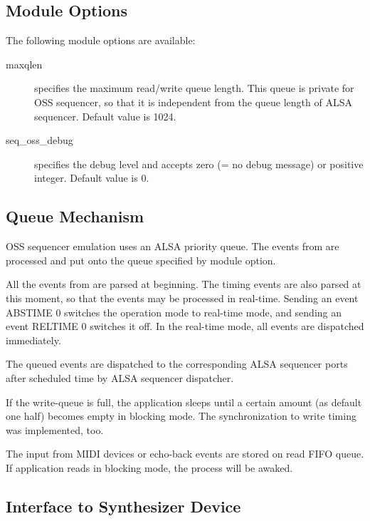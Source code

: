 \documentclass[a4paper,8pt,english]{sphinxmanual}
\begin{document}
\subsection{Module Options}
\label{sound/designs/seq-oss:module-options}
The following module options are available:
\begin{description}
\item[{maxqlen}] \leavevmode
specifies the maximum read/write queue length. This queue is private
for OSS sequencer, so that it is independent from the queue length of ALSA
sequencer. Default value is 1024.

\item[{seq\_oss\_debug}] \leavevmode
specifies the debug level and accepts zero (= no debug message) or
positive integer. Default value is 0.

\end{description}


\subsection{Queue Mechanism}
\label{sound/designs/seq-oss:queue-mechanism}
OSS sequencer emulation uses an ALSA priority queue. The
events from  are processed and put onto the queue
specified by module option.

All the events from  are parsed at beginning.
The timing events are also parsed at this moment, so that the events may
be processed in real-time. Sending an event ABSTIME 0 switches the operation
mode to real-time mode, and sending an event RELTIME 0 switches it off.
In the real-time mode, all events are dispatched immediately.

The queued events are dispatched to the corresponding ALSA sequencer
ports after scheduled time by ALSA sequencer dispatcher.

If the write-queue is full, the application sleeps until a certain amount
(as default one half) becomes empty in blocking mode. The synchronization
to write timing was implemented, too.

The input from MIDI devices or echo-back events are stored on read FIFO
queue. If application reads  in blocking mode, the
process will be awaked.


\subsection{Interface to Synthesizer Device}
\label{sound/designs/seq-oss:interface-to-synthesizer-device}
\end{document}

